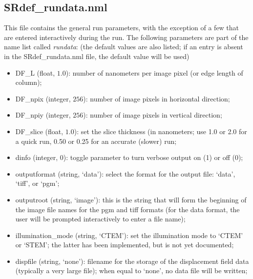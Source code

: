 \documentclass[11pt]{article}
\begin{document}
\subsection{SRdef\_rundata.nml}
This file contains the general run parameters, with the exception of a few that are entered interactively during the run.  The following parameters
are part of the name list called \textit{rundata}: (the default values are also listed; if an entry is absent in the SRdef\_rundata.nml file, the default value will be used)
\begin{itemize}
\item \textsf{DF\_L} (float, $1.0$): number of nanometers per image pixel (or edge length of column);
\item \textsf{DF\_npix} (integer, $256$): number of image pixels in horizontal direction;
\item \textsf{DF\_npiy} (integer, $256$): number of image pixels in vertical direction;
\item \textsf{DF\_slice} (float, $1.0$): set the slice thickness (in nanometers; use 1.0 or 2.0 for a quick run, 0.50 or 0.25 for an accurate (slower) run; 
\item \textsf{dinfo} (integer, 0): toggle parameter to turn verbose output on (1) or off (0);
\item \textsf{outputformat} (string, `data'):  select the format for the output file: `data', `tiff', or `pgm';
\item \textsf{outputroot} (string, `image'): this is the string that will form the beginning of the image file names for the pgm and tiff formats (for the data format, the user will be prompted interactively to enter a file name);
\item \textsf{illumination\_mode} (string, `CTEM'): set the illumination mode to `CTEM' or `STEM'; the latter has been implemented, but is not yet documented;
\item \textsf{dispfile} (string, `none'):  filename for the storage of the displacement field data (typically a very large file); when equal to `none', no data file will be written;

\end{itemize}
\end{document}
